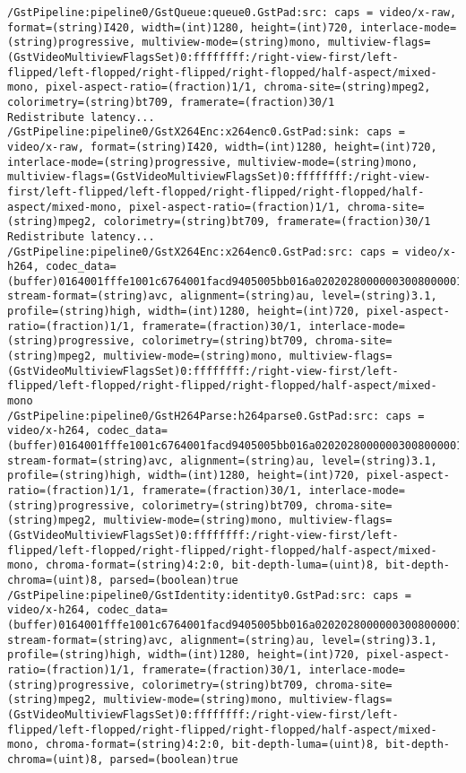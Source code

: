 \documentclass[12pt,oneside]{book}
\begin{document}
\begin{lstlisting}
/GstPipeline:pipeline0/GstQueue:queue0.GstPad:src: caps = video/x-raw, format=(string)I420, width=(int)1280, height=(int)720, interlace-mode=(string)progressive, multiview-mode=(string)mono, multiview-flags=(GstVideoMultiviewFlagsSet)0:ffffffff:/right-view-first/left-flipped/left-flopped/right-flipped/right-flopped/half-aspect/mixed-mono, pixel-aspect-ratio=(fraction)1/1, chroma-site=(string)mpeg2, colorimetry=(string)bt709, framerate=(fraction)30/1
Redistribute latency...
/GstPipeline:pipeline0/GstX264Enc:x264enc0.GstPad:sink: caps = video/x-raw, format=(string)I420, width=(int)1280, height=(int)720, interlace-mode=(string)progressive, multiview-mode=(string)mono, multiview-flags=(GstVideoMultiviewFlagsSet)0:ffffffff:/right-view-first/left-flipped/left-flopped/right-flipped/right-flopped/half-aspect/mixed-mono, pixel-aspect-ratio=(fraction)1/1, chroma-site=(string)mpeg2, colorimetry=(string)bt709, framerate=(fraction)30/1
Redistribute latency...
/GstPipeline:pipeline0/GstX264Enc:x264enc0.GstPad:src: caps = video/x-h264, codec_data=(buffer)0164001fffe1001c6764001facd9405005bb016a02020280000003008000001e478c18cb01000568ebecb22c, stream-format=(string)avc, alignment=(string)au, level=(string)3.1, profile=(string)high, width=(int)1280, height=(int)720, pixel-aspect-ratio=(fraction)1/1, framerate=(fraction)30/1, interlace-mode=(string)progressive, colorimetry=(string)bt709, chroma-site=(string)mpeg2, multiview-mode=(string)mono, multiview-flags=(GstVideoMultiviewFlagsSet)0:ffffffff:/right-view-first/left-flipped/left-flopped/right-flipped/right-flopped/half-aspect/mixed-mono
/GstPipeline:pipeline0/GstH264Parse:h264parse0.GstPad:src: caps = video/x-h264, codec_data=(buffer)0164001fffe1001c6764001facd9405005bb016a02020280000003008000001e478c18cb01000568ebecb22c, stream-format=(string)avc, alignment=(string)au, level=(string)3.1, profile=(string)high, width=(int)1280, height=(int)720, pixel-aspect-ratio=(fraction)1/1, framerate=(fraction)30/1, interlace-mode=(string)progressive, colorimetry=(string)bt709, chroma-site=(string)mpeg2, multiview-mode=(string)mono, multiview-flags=(GstVideoMultiviewFlagsSet)0:ffffffff:/right-view-first/left-flipped/left-flopped/right-flipped/right-flopped/half-aspect/mixed-mono, chroma-format=(string)4:2:0, bit-depth-luma=(uint)8, bit-depth-chroma=(uint)8, parsed=(boolean)true
/GstPipeline:pipeline0/GstIdentity:identity0.GstPad:src: caps = video/x-h264, codec_data=(buffer)0164001fffe1001c6764001facd9405005bb016a02020280000003008000001e478c18cb01000568ebecb22c, stream-format=(string)avc, alignment=(string)au, level=(string)3.1, profile=(string)high, width=(int)1280, height=(int)720, pixel-aspect-ratio=(fraction)1/1, framerate=(fraction)30/1, interlace-mode=(string)progressive, colorimetry=(string)bt709, chroma-site=(string)mpeg2, multiview-mode=(string)mono, multiview-flags=(GstVideoMultiviewFlagsSet)0:ffffffff:/right-view-first/left-flipped/left-flopped/right-flipped/right-flopped/half-aspect/mixed-mono, chroma-format=(string)4:2:0, bit-depth-luma=(uint)8, bit-depth-chroma=(uint)8, parsed=(boolean)true

\end{lstlisting}
\end{document}
